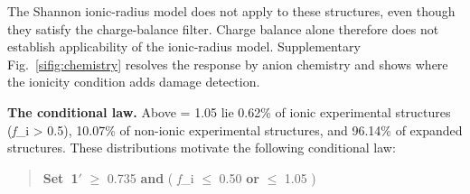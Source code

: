 The Shannon ionic-radius model does not apply to these structures, even though
they satisfy the charge-balance filter. Charge balance alone therefore does not
establish applicability of the ionic-radius model. Supplementary
Fig.~\ref{sifig:chemistry} resolves the response by anion chemistry and shows
where the ionicity condition adds damage detection.

\textbf{The conditional law.} Above \rhoc{} = 1.05 lie 0.62\% of ionic experimental structures (\emph{f}\_i \textgreater{} 0.5),
10.07\% of non-ionic experimental structures, and 96.14\% of expanded
structures. These distributions motivate the following conditional law:

\begin{quote}
\textbf{Set~1$'$} \rhoc{} $\geq$ 0.735 \textbf{and} ( \emph{f}\_i $\leq$ 0.50 \textbf{or} \rhoc{} $\leq$ 1.05 )
\end{quote}

